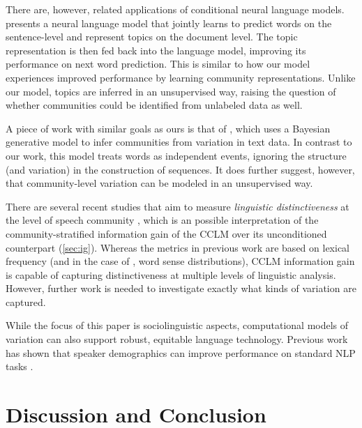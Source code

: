 \documentclass[11pt]{article}
\begin{document}
There are, however, related applications of conditional neural language models.
\citet{Lau2017a} presents a neural language model that jointly learns to predict
words on the sentence-level and represent topics on the document level.
The topic representation is then fed back into the language model, 
improving its performance on next word prediction.
This is similar to how our model experiences improved performance
by learning community representations. 
Unlike our model, topics are inferred in an unsupervised way, 
raising the question of whether communities could be identified from 
unlabeled data as well.

A piece of work with similar goals as ours is that of \citet{OConnor2010}, which uses a Bayesian generative
model to infer communities from variation in text data.  In contrast
to our work, this model treats words as independent events, ignoring
the structure (and variation) in the construction of sequences.  It
does further suggest, however, that community-level variation can be
modeled in an unsupervised way.

There are several recent studies that aim to measure \emph{linguistic distinctiveness}
at the level of speech community \citep{OConnor2010,Zhang2018,Lucy2021}, 
which is an possible interpretation of the community-stratified information gain 
of the CCLM over its unconditioned counterpart (\cref{sec:ig}). 
Whereas the metrics in previous work are based on lexical frequency
(and in the case of \citet{Lucy2021}, word sense distributions),
CCLM information gain is capable of capturing 
distinctiveness at multiple levels of linguistic analysis. 
However, further work is needed to
investigate exactly what kinds of variation are captured.

While the focus of this paper is sociolinguistic aspects,
computational models of variation can also support 
robust, equitable language technology.  Previous work has shown that
speaker demographics can improve performance on standard NLP tasks
\citep{Hovy2015,Yang2017}. %


\section{Discussion and Conclusion}\label{sec:discussion-conclusion}
\end{document}
